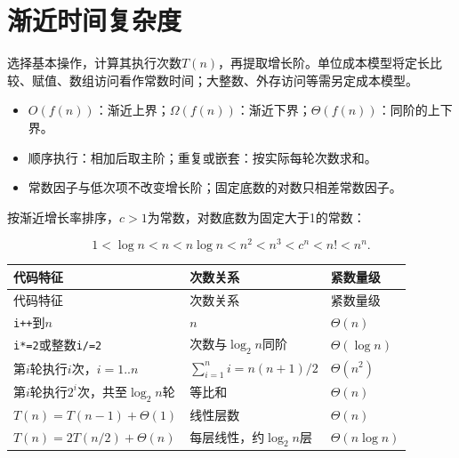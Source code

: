 \section{渐近时间复杂度}\label{DS01-time}

选择基本操作，计算其执行次数\(T(n)\)，再提取增长阶。单位成本模型将定长比较、赋值、数组访问看作常数时间；大整数、外存访问等需另定成本模型。

\begin{itemize}
\tightlist
\item
  \(O(f(n))\)：渐近上界；\(\Omega(f(n))\)：渐近下界；\(\Theta(f(n))\)：同阶的上下界。
\item
  顺序执行：相加后取主阶；重复或嵌套：按实际每轮次数求和。
\item
  常数因子与低次项不改变增长阶；固定底数的对数只相差常数因子。
\end{itemize}

按渐近增长率排序，\(c>1\)为常数，对数底数为固定大于1的常数：

\[1 < \log n < n < n\log n < n^2 < n^3 < c^n < n! < n^n.\]

\par\smallskip
{\fontsize{9.3}{12}\selectfont\setlength{\tabcolsep}{2.5pt}\setlength{\LTleft}{0pt}\setlength{\LTright}{0pt}
\begin{longtable}{@{}>{\raggedright\arraybackslash}p{}>{\raggedright\arraybackslash}p{}>{\raggedright\arraybackslash}p{}@{}}
\toprule
代码特征 & 次数关系 & 紧数量级 \\

\midrule\endfirsthead\toprule
代码特征 & 次数关系 & 紧数量级 \\

\midrule\endhead\bottomrule\endfoot
\texttt{i++}到\(n\) & \(n\) & \(\Theta(n)\) \\

\texttt{i*=2}或整数\texttt{i/=2} & 次数与\(\log_2n\)同阶 & \(\Theta(\log n)\) \\

第\(i\)轮执行\(i\)次，\(i=1..n\) & \(\sum_{i=1}^n i=n(n+1)/2\) & \(\Theta(n^2)\) \\

第\(i\)轮执行\(2^i\)次，共至\(\log_2n\)轮 & 等比和 & \(\Theta(n)\) \\

\(T(n)=T(n-1)+\Theta(1)\) & 线性层数 & \(\Theta(n)\) \\

\(T(n)=2T(n/2)+\Theta(n)\) & 每层线性，约\(\log_2n\)层 & \(\Theta(n\log n)\) \\

\end{longtable}}
\par\smallskip

